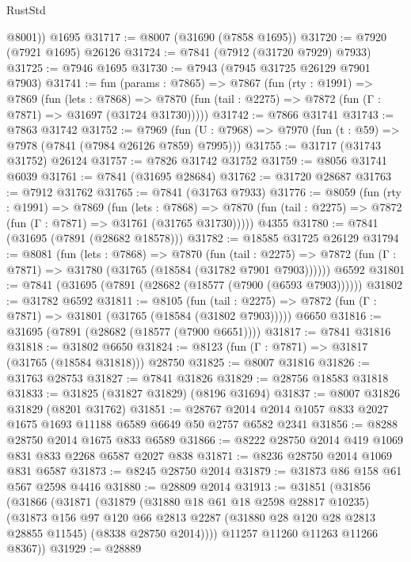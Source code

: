 \begin{lexlean}{RustStd}
\begin{coremodule}
        @8001))
    @1695
@31717 := @8007 (@31690 (@7858 @1695))
@31720 := @7920 (@7921 @1695) @26126
@31724 := @7841 (@7912 (@31720 @7929) @7933)
@31725 := @7946 @1695
@31730 := @7943 (@7945 @31725 @26129 @7901 @7903)
@31741 := fun (params : @7865) =>
  @7867
    (fun (rty : @1991) =>
    @7869
      (fun (lets : @7868) =>
      @7870 (fun (tail : @2275) => @7872 (fun (Γ : @7871) => @31697 (@31724 @31730)))))
@31742 := @7866 @31741
@31743 := @7863 @31742
@31752 := @7969
    (fun (U : @7968) => @7970 (fun (t : @59) => @7978 (@7841 (@7984 @26126 @7859) @7995)))
@31755 := @31717 (@31743 @31752) @26124
@31757 := @7826 @31742 @31752
@31759 := @8056 @31741 @6039
@31761 := @7841 (@31695 @28684)
@31762 := @31720 @28687
@31763 := @7912 @31762
@31765 := @7841 (@31763 @7933)
@31776 := @8059
    (fun (rty : @1991) =>
    @7869
      (fun (lets : @7868) =>
      @7870 (fun (tail : @2275) => @7872 (fun (Γ : @7871) => @31761 (@31765 @31730)))))
    @4355
@31780 := @7841 (@31695 (@7891 (@28682 @18578)))
@31782 := @18585 @31725 @26129
@31794 := @8081
    (fun (lets : @7868) =>
    @7870
      (fun (tail : @2275) =>
      @7872 (fun (Γ : @7871) => @31780 (@31765 (@18584 (@31782 @7901 @7903))))))
    @6592
@31801 := @7841 (@31695 (@7891 (@28682 (@18577 (@7900 (@6593 @7903))))))
@31802 := @31782 @6592
@31811 := @8105
    (fun (tail : @2275) => @7872 (fun (Γ : @7871) => @31801 (@31765 (@18584 (@31802 @7903)))))
    @6650
@31816 := @31695 (@7891 (@28682 (@18577 (@7900 @6651))))
@31817 := @7841 @31816
@31818 := @31802 @6650
@31824 := @8123 (fun (Γ : @7871) => @31817 (@31765 (@18584 @31818))) @28750
@31825 := @8007 @31816
@31826 := @31763 @28753
@31827 := @7841 @31826
@31829 := @28756 @18583 @31818
@31833 := @31825 (@31827 @31829) (@8196 @31694)
@31837 := @8007 @31826 @31829 (@8201 @31762)
@31851 := @28767 @2014 @2014 @1057 @833 @2027 @1675 @1693 @11188 @6589 @6649 @50 @2757 @6582 @2341
@31856 := @8288 @28750 @2014 @1675 @833 @6589
@31866 := @8222 @28750 @2014 @419 @1069 @831 @833 @2268 @6587 @2027 @838
@31871 := @8236 @28750 @2014 @1069 @831 @6587
@31873 := @8245 @28750 @2014
@31879 := @31873 @86 @158 @61 @567 @2598 @4416
@31880 := @28809 @2014
@31913 := @31851
    (@31856
      (@31866
        (@31871
          (@31879
            (@31880 @18 @61 @18 @2598 @28817 @10235)
            (@31873
              @156
              @97
              @120
              @66
              @2813
              @2287
              (@31880 @28 @120 @28 @2813 @28855 @11545)
              (@8338 @28750 @2014))))
        @11257
        @11260
        @11263
        @11266
        @8367))
@31929 := @28889

\end{coremodule}
\end{lexlean}
